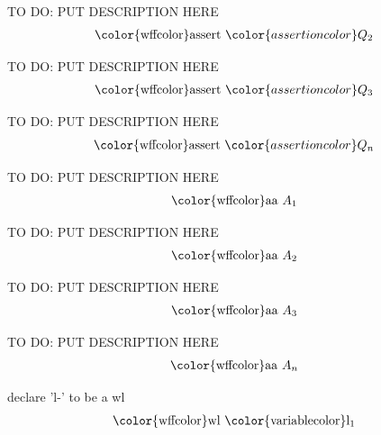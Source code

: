 \begin{lemma} TO DO: PUT DESCRIPTION HERE
\begin{align}
{\rm\color{wffcolor}assert}~ {\color{assertioncolor}Q_2}\label{assQ2}
\end{align}
\end{lemma}

\begin{lemma} TO DO: PUT DESCRIPTION HERE
\begin{align}
{\rm\color{wffcolor}assert}~ {\color{assertioncolor}Q_3}\label{assQ3}
\end{align}
\end{lemma}

\begin{lemma} TO DO: PUT DESCRIPTION HERE
\begin{align}
{\rm\color{wffcolor}assert}~ {\color{assertioncolor}Q_n}\label{assQn}
\end{align}
\end{lemma}

\begin{lemma} TO DO: PUT DESCRIPTION HERE
\begin{align}
{\rm\color{wffcolor}aa}~ A_1\label{aa1}
\end{align}
\end{lemma}

\begin{lemma} TO DO: PUT DESCRIPTION HERE
\begin{align}
{\rm\color{wffcolor}aa}~ A_2\label{aa2}
\end{align}
\end{lemma}

\begin{lemma} TO DO: PUT DESCRIPTION HERE
\begin{align}
{\rm\color{wffcolor}aa}~ A_3\label{aa3}
\end{align}
\end{lemma}

\begin{lemma} TO DO: PUT DESCRIPTION HERE
\begin{align}
{\rm\color{wffcolor}aa}~ A_n\label{aan}
\end{align}
\end{lemma}

\begin{lemma} declare 'l-' to be a wl
\begin{align}
{\rm\color{wffcolor} wl}~ {\rm\color{variablecolor}l_1}\label{wl1}
\end{align}
\end{lemma}

